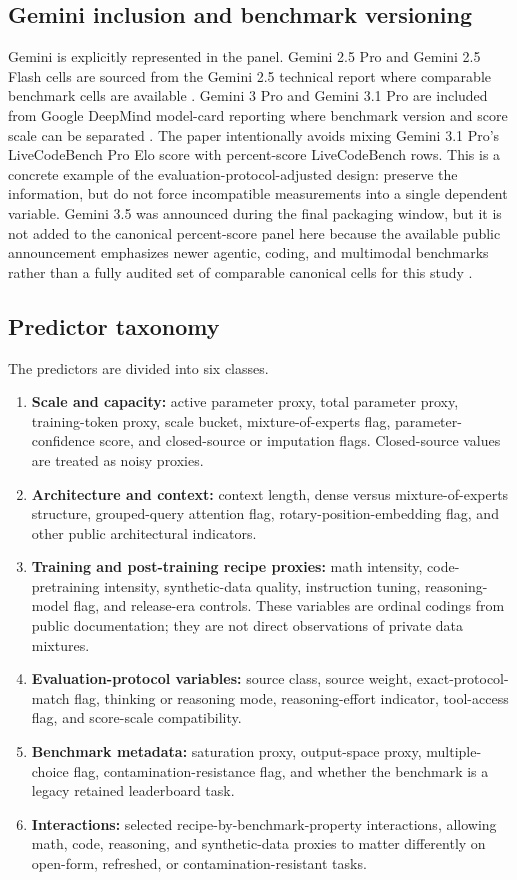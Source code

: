 \documentclass[11pt]{article}
\begin{document}
\subsection{Gemini inclusion and benchmark versioning}
Gemini is explicitly represented in the panel. Gemini 2.5 Pro and Gemini 2.5 Flash cells are sourced from the Gemini 2.5 technical report where comparable benchmark cells are available \citep{gemini25report}. Gemini 3 Pro and Gemini 3.1 Pro are included from Google DeepMind model-card reporting where benchmark version and score scale can be separated \citep{gemini31card}. The paper intentionally avoids mixing Gemini 3.1 Pro's LiveCodeBench Pro Elo score with percent-score LiveCodeBench rows. This is a concrete example of the evaluation-protocol-adjusted design: preserve the information, but do not force incompatible measurements into a single dependent variable. Gemini 3.5 was announced during the final packaging window, but it is not added to the canonical percent-score panel here because the available public announcement emphasizes newer agentic, coding, and multimodal benchmarks rather than a fully audited set of comparable canonical cells for this study \citep{gemini35blog}.

\subsection{Predictor taxonomy}
The predictors are divided into six classes.
\begin{enumerate}[leftmargin=*]
\item \textbf{Scale and capacity:} active parameter proxy, total parameter proxy, training-token proxy, scale bucket, mixture-of-experts flag, parameter-confidence score, and closed-source or imputation flags. Closed-source values are treated as noisy proxies.
\item \textbf{Architecture and context:} context length, dense versus mixture-of-experts structure, grouped-query attention flag, rotary-position-embedding flag, and other public architectural indicators.
\item \textbf{Training and post-training recipe proxies:} math intensity, code-pretraining intensity, synthetic-data quality, instruction tuning, reasoning-model flag, and release-era controls. These variables are ordinal codings from public documentation; they are not direct observations of private data mixtures.
\item \textbf{Evaluation-protocol variables:} source class, source weight, exact-protocol-match flag, thinking or reasoning mode, reasoning-effort indicator, tool-access flag, and score-scale compatibility.
\item \textbf{Benchmark metadata:} saturation proxy, output-space proxy, multiple-choice flag, contamination-resistance flag, and whether the benchmark is a legacy retained leaderboard task.
\item \textbf{Interactions:} selected recipe-by-benchmark-property interactions, allowing math, code, reasoning, and synthetic-data proxies to matter differently on open-form, refreshed, or contamination-resistant tasks.
\end{enumerate}
\end{document}

